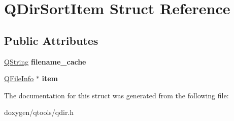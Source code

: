 \hypertarget{struct_q_dir_sort_item}{}\section{Q\+Dir\+Sort\+Item Struct Reference}
\label{struct_q_dir_sort_item}
\subsection*{Public Attributes}
\begin{DoxyCompactItemize}
\item 
\mbox{\label{struct_q_dir_sort_item_aeaaaa4a9f88629bbbd1259f355a74a39}} 
\mbox{\hyperlink{class_q_string}{Q\+String}} {\bfseries filename\+\_\+cache}
\item 
\mbox{\label{struct_q_dir_sort_item_ae6631193dc0be8650862d59896c3550c}} 
\mbox{\hyperlink{class_q_file_info}{Q\+File\+Info}} $\ast$ {\bfseries item}
\end{DoxyCompactItemize}


The documentation for this struct was generated from the following file\+:\begin{DoxyCompactItemize}
\item 
doxygen/qtools/qdir.\+h\end{DoxyCompactItemize}
